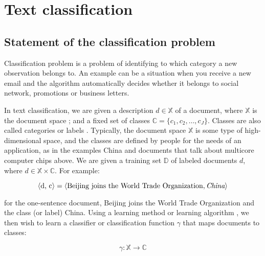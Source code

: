 \chapter{Text classification} \label{chapt1}


\section{Statement of the classification problem} \label{sect1_2}


Classification problem is a problem of identifying to which category a new observation belongs to. An example can be a situation when you receive a new email and the algorithm automatically decides whether it belongs to social network, promotions or business letters.


\newcommand{\docsetlabeled}{\mathbb{D}}

In text classification, we are given a description  $d \in \mathbb{X}$ of a document, where $\mathbb{X}$ is the document space ; and a fixed set of classes  $\mathbb{C} = \{ c_1,c_2,\ldots,c_J \}$. Classes are also called categories or labels . Typically, the document space  $\mathbb{X}$ is some type of high-dimensional space, and the classes are defined by people for the needs of an application, as in the examples China and documents that talk about multicore computer chips above. We are given a training set  $\docsetlabeled$ of labeled documents  $d $, where  $d \in \mathbb{X} \times \mathbb{C}$. For example: 

\begin{equation}
\label{eq:equation3}
\langle\mbox{d, c}\rangle=\langle\mbox{Beijing joins the World Trade Organization}, \emph{China}\rangle
\end{equation}
\begin{doublespacing}
\end{doublespacing}

for the one-sentence document, Beijing joins the World Trade Organization and the class (or label) China.
Using a learning method or learning algorithm , we then wish to learn a classifier or classification function  $\gamma $ that maps documents to classes:

\begin{equation}
	\label{eq:equation4}
	\gamma: \mathbb{X} \rightarrow \mathbb{C}
\end{equation}
\begin{doublespacing}
\end{doublespacing}

